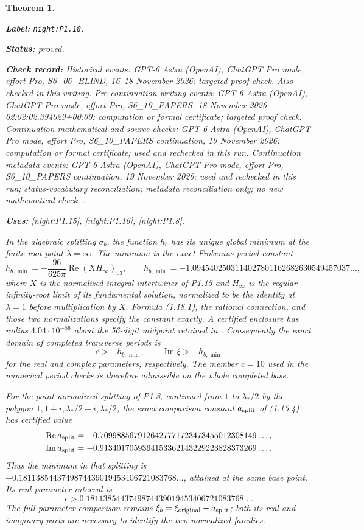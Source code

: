 \documentclass[11pt,a4paper]{article}
\newtheorem{theorem}{Theorem}[section]
\theoremstyle{definition}
\newcommand{\StatementRecord}[4]{\par\smallskip\begingroup\upshape\raggedright\noindent\textbf{Label:} \nolinkurl{#1}.\par\noindent\textbf{Status:} #2.\par\noindent\textbf{Check record:} #3.\par\noindent\textbf{Uses:} #4.\par\endgroup\smallskip}
\begin{document}
\begin{theorem}\label{night:P1.18}
\StatementRecord{night:P1.18}{proved}{Historical events: GPT-6 Astra (OpenAI), ChatGPT Pro mode, effort Pro, S6\_06\_BLIND, 16--18 November 2026: targeted proof check. Also checked in this writing. Pre-continuation writing events: GPT-6 Astra (OpenAI), ChatGPT Pro mode, effort Pro, S6\_10\_PAPERS, 18 November 2026 02:02:02.394029+00:00: computation or formal certificate; targeted proof check. Continuation mathematical and source checks: GPT-6 Astra (OpenAI), ChatGPT Pro mode, effort Pro, S6\_10\_PAPERS continuation, 19 November 2026: computation or formal certificate; used and rechecked in this run. Continuation metadata events: GPT-6 Astra (OpenAI), ChatGPT Pro mode, effort Pro, S6\_10\_PAPERS continuation, 19 November 2026: used and rechecked in this run; status-vocabulary reconciliation; metadata reconciliation only; no new mathematical check. }{\cref{night:P1.15}, \cref{night:P1.16}, \cref{night:P1.8}}
In the algebraic splitting $\sigma_b$, the function $h_b$ has its
unique global minimum at the finite-root point $\lambda=\infty$.
The minimum is the exact Frobenius period constant
\[
 h_{b,\min}=-\frac{96}{625\pi}\operatorname{Re}(XH_\infty)_{03},
 \qquad
 h_{b,\min}=-1.0945402503114027801162682630549457037\ldots,
\tag{1.18.1}
\]
where $X$ is the normalized integral intertwiner of P1.15 and
$H_\infty$ is the regular infinity-root limit of its fundamental
solution, normalized to be the identity at $\lambda=1$ before
multiplication by $X$.  Formula (1.18.1), the rational connection,
and those two normalizations specify the constant exactly.
A certified enclosure has radius $4.04\cdot10^{-56}$ about the
56-digit midpoint retained in
.
Consequently the exact domain of completed transverse periods is
\[
 c>-h_{b,\min},\qquad
 \operatorname{Im}\xi>-h_{b,\min}
\]
for the real and complex parameters, respectively.
The member $c=10$ used in the numerical period checks is therefore
admissible on the whole completed base.

For the point-normalized splitting of P1.8, continued from
$1$ to $\lambda_*/2$ by the polygon
$1,1+i,\lambda_*/2+i,\lambda_*/2$, the exact comparison constant
$a_{\rm split}$ of (1.15.4) has certified value
\[
\begin{split}
 \operatorname{Re}a_{\rm split}
   &=-0.7099885679126427771723473455012308149\ldots,\\
 \operatorname{Im}a_{\rm split}
   &=-0.9134017059364153362143229223828373269\ldots.
\end{split}
\]
Thus the minimum in that splitting is
$-0.1811385443749874439019453406721083768\ldots$,
attained at the same base point.  Its real parameter interval is
\[
 c>0.1811385443749874439019453406721083768\ldots.
\]
The full parameter comparison remains
$\xi_b=\xi_{\rm original}-a_{\rm split}$; both its real and imaginary
parts are necessary to identify the two normalized families.
\end{theorem}
\end{document}
